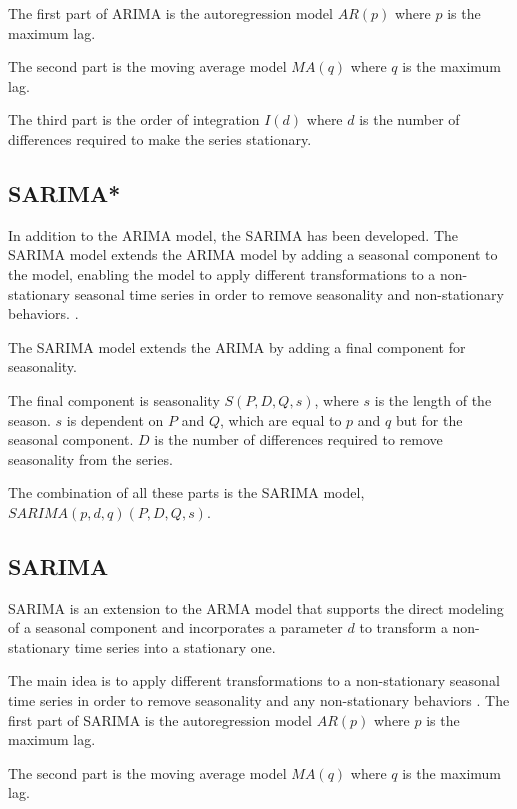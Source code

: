 The first part of ARIMA is the autoregression model
$AR(p)$ where $p$ is the maximum lag.

The second part is the moving average model $MA(q)$ where $q$ is the maximum lag.

The third part is the order of integration $I(d)$ where $d$ is the number of
differences required to make the series stationary.


\subsection{SARIMA*}
In addition to the ARIMA model, the SARIMA has been developed.
The SARIMA model extends the ARIMA model by adding a seasonal component to the model,
enabling the model to apply different transformations to a non-stationary seasonal time series in order to remove seasonality and non-stationary behaviors.
\citep[p. 327-385]{Utlaut2008}.

The SARIMA model extends the ARIMA by adding a final component for seasonality.

The final component is seasonality $S(P, D, Q, s)$, where $s$ is the length
of the season.
$s$ is dependent on $P$ and $Q$, which are equal to $p$ and $q$ but for the seasonal component.
$D$ is the number of differences required to remove seasonality from the series.

The combination of all these parts is the SARIMA model,
$SARIMA(p, d, q)(P, D, Q, s)$.




\iffalse
  \subsection{SARIMA}
  SARIMA is an extension to the ARMA model that supports the direct modeling of a seasonal component and incorporates a parameter $d$
  to transform a non-stationary time series into a stationary one.

  The main idea is to apply different transformations to a non-stationary seasonal time series
  in order to remove seasonality and any non-stationary behaviors
  \citep[p. 327-385]{Utlaut2008}.
  The first part of SARIMA is the autoregression model
  $AR(p)$ where $p$ is the maximum lag.

  The second part is the moving average model $MA(q)$ where $q$ is the maximum lag.

